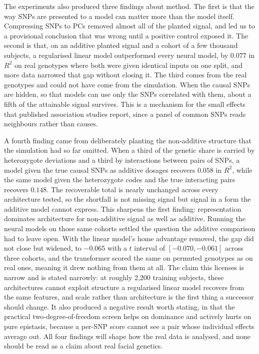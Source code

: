 The experiments also produced three findings about method. The first is that the way SNPs are presented to a model can matter more than the model itself. Compressing SNPs to PCs removed almost all of the planted signal, and led us to a provisional conclusion that was wrong until a positive control exposed it. The second is that, on an additive planted signal and a cohort of a few thousand subjects, a regularised linear model outperformed every neural model, by $0.077$ in $R^2$ on real genotypes where both were given identical inputs on one split, and more data narrowed that gap without closing it. The third comes from the real genotypes and could not have come from the simulation. When the causal SNPs are hidden, so that models can use only the SNPs correlated with them, about a fifth of the attainable signal survives. This is a mechanism for the small effects that published association studies report, since a panel of common SNPs reads neighbours rather than causes.

A fourth finding came from deliberately planting the non-additive structure that the simulation had so far omitted. When a third of the genetic share is carried by heterozygote deviations and a third by interactions between pairs of SNPs, a model given the true causal SNPs as additive dosages recovers $0.058$ in $R^2$, while the same model given the heterozygote codes and the true interacting pairs recovers $0.148$. The recoverable total is nearly unchanged across every architecture tested, so the shortfall is not missing signal but signal in a form the additive model cannot express. This sharpens the first finding: representation dominates architecture for non-additive signal as well as additive. Running the neural models on those same cohorts settled the question the additive comparison had to leave open. With the linear model's home advantage removed, the gap did not close but widened, to $-0.065$ with a $t$ interval of $[-0.070,-0.061]$ across three cohorts, and the transformer scored the same on permuted genotypes as on real ones, meaning it drew nothing from them at all. The claim this licenses is narrow and is stated narrowly: at roughly 2,200 training subjects, these architectures cannot exploit structure a regularised linear model recovers from the same features, and scale rather than architecture is the first thing a successor should change. It also produced a negative result worth stating, in that the practical two-degree-of-freedom screen helps on dominance and actively hurts on pure epistasis, because a per-SNP score cannot see a pair whose individual effects average out. All four findings will shape how the real data is analysed, and none should be read as a claim about real facial genetics.

